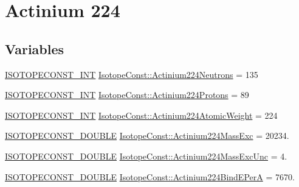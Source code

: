 \hypertarget{group___isotope_const-_actinium-_ac224}{}\section{Actinium 224}
\label{group___isotope_const-_actinium-_ac224}
\subsection*{Variables}
\begin{DoxyCompactItemize}
\item 
\mbox{\hyperlink{group___isotope_const-_macros_ga5f18360b3e99483a35c32d789e62621c}{I\+S\+O\+T\+O\+P\+E\+C\+O\+N\+S\+T\+\_\+\+I\+NT}} \mbox{\hyperlink{group___isotope_const-_actinium-_ac224_gaba9257202c22fbe6a4d5c78243ebafcc}{Isotope\+Const\+::\+Actinium224\+Neutrons}} = 135
\item 
\mbox{\hyperlink{group___isotope_const-_macros_ga5f18360b3e99483a35c32d789e62621c}{I\+S\+O\+T\+O\+P\+E\+C\+O\+N\+S\+T\+\_\+\+I\+NT}} \mbox{\hyperlink{group___isotope_const-_actinium-_ac224_ga47ed6e9f7cf27c4d98bd094947201a89}{Isotope\+Const\+::\+Actinium224\+Protons}} = 89
\item 
\mbox{\hyperlink{group___isotope_const-_macros_ga5f18360b3e99483a35c32d789e62621c}{I\+S\+O\+T\+O\+P\+E\+C\+O\+N\+S\+T\+\_\+\+I\+NT}} \mbox{\hyperlink{group___isotope_const-_actinium-_ac224_ga6b80c72612eb047d5c9826c25d9b4b69}{Isotope\+Const\+::\+Actinium224\+Atomic\+Weight}} = 224
\item 
\mbox{\hyperlink{group___isotope_const-_macros_ga8f45a7272ce02c0b4c65c44636ed719a}{I\+S\+O\+T\+O\+P\+E\+C\+O\+N\+S\+T\+\_\+\+D\+O\+U\+B\+LE}} \mbox{\hyperlink{group___isotope_const-_actinium-_ac224_gab4d68e1fd9d4e6ce4822e554324a503f}{Isotope\+Const\+::\+Actinium224\+Mass\+Exc}} = 20234.
\item 
\mbox{\hyperlink{group___isotope_const-_macros_ga8f45a7272ce02c0b4c65c44636ed719a}{I\+S\+O\+T\+O\+P\+E\+C\+O\+N\+S\+T\+\_\+\+D\+O\+U\+B\+LE}} \mbox{\hyperlink{group___isotope_const-_actinium-_ac224_ga759c3685acea304e0d39b4508e162a61}{Isotope\+Const\+::\+Actinium224\+Mass\+Exc\+Unc}} = 4.
\item 
\mbox{\hyperlink{group___isotope_const-_macros_ga8f45a7272ce02c0b4c65c44636ed719a}{I\+S\+O\+T\+O\+P\+E\+C\+O\+N\+S\+T\+\_\+\+D\+O\+U\+B\+LE}} \mbox{\hyperlink{group___isotope_const-_actinium-_ac224_ga3bfef9ae14a98983306d82121f8bd316}{Isotope\+Const\+::\+Actinium224\+Bind\+E\+PerA}} = 7670.
\item 

\end{DoxyCompactItemize}
